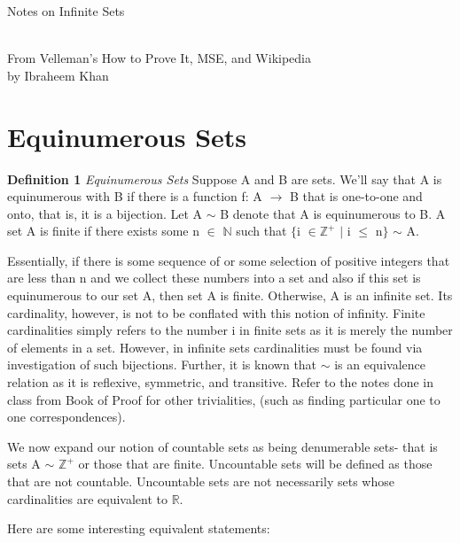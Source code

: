 \documentclass{article}
\begin{document}
\setlength\parindent{24pt}
\begin{center}
\begin{huge}
Notes on Infinite Sets
\end{huge}
\\
From Velleman's How to Prove It, MSE, and Wikipedia
\\
by Ibraheem Khan
\end{center}

\section{Equinumerous Sets}

\textbf{Definition 1} \textit{Equinumerous Sets} Suppose A and B are sets. We'll say that A is equinumerous with B if there is a function f: A $\to$ B that is one-to-one and onto, that is, it is a bijection. Let A $\sim$ B denote that A is equinumerous to B. A set A is finite if there exists some n $\in$ $\mathbb{N}$ such that $\{$i $\in \mathbb{Z}^{+}$ $|$ i $\leq$ n$\}$ $\sim$ A.
\\
\par Essentially, if there is some sequence of or some selection of positive integers that are less than n and we collect these numbers into a set and also if this set is equinumerous to our set A, then set A is finite. Otherwise, A is an infinite set. Its cardinality, however, is not to be conflated with this notion of infinity. Finite cardinalities simply refers to the number i in finite sets as it is merely the number of elements in a set. However, in infinite sets cardinalities must be found via investigation of such bijections. Further, it is known that $\sim$ is an equivalence relation as it is reflexive, symmetric, and transitive. Refer to the notes done in class from Book of Proof for other trivialities, (such as finding particular one to one correspondences). 
\\
\par We now expand our notion of countable sets as being denumerable sets- that is sets A $\sim$ $\mathbb{Z}^{+}$ or those that are finite. Uncountable sets will be defined as those that are not countable. Uncountable sets are not necessarily sets whose cardinalities are equivalent to $\mathbb{R}$. 
\\
\par Here are some interesting equivalent statements:
\end{document}
